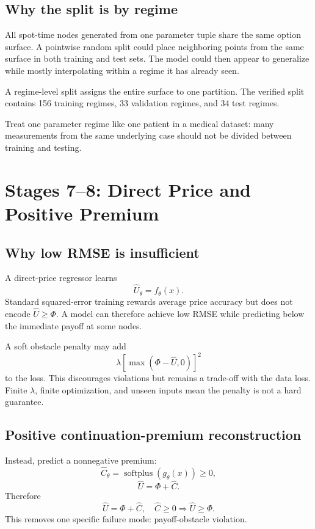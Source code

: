 \subsection{Why the split is by regime}
All spot-time nodes generated from one parameter tuple share the same option
surface. A pointwise random split could place neighboring points from the same
surface in both training and test sets. The model could then appear to
generalize while mostly interpolating within a regime it has already seen.

A regime-level split assigns the entire surface to one partition. The verified
split contains 156 training regimes, 33 validation regimes, and 34 test
regimes.

\begin{readerintuition}
Treat one parameter regime like one patient in a medical dataset: many
measurements from the same underlying case should not be divided between
training and testing.
\end{readerintuition}

\section{Stages 7--8: Direct Price and Positive Premium}

\subsection{Why low RMSE is insufficient}
A direct-price regressor learns
\[
  \widehat U_\theta=f_\theta(x).
\]
Standard squared-error training rewards average price accuracy but does not
encode \(\widehat U\geq\Phi\). A model can therefore achieve low RMSE while
predicting below the immediate payoff at some nodes.

A soft obstacle penalty may add
\[
  \lambda
  \left[\max\!\left(\Phi-\widehat U,0\right)\right]^2
\]
to the loss. This discourages violations but remains a trade-off with the data
loss. Finite \(\lambda\), finite optimization, and unseen inputs mean the
penalty is not a hard guarantee.

\subsection{Positive continuation-premium reconstruction}
Instead, predict a nonnegative premium:
\[
  \widehat C_\theta=\operatorname{softplus}(g_\theta(x))\geq0,
\]
\[
  \widehat U=\Phi+\widehat C.
\]
Therefore
\[
  \widehat U=\Phi+\widehat C,\quad \widehat C\geq0
  \Rightarrow
  \widehat U\geq\Phi.
\]
This removes one specific failure mode: payoff-obstacle violation.

